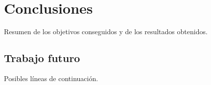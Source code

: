 \chapter{Conclusiones}

Resumen de los objetivos conseguidos y de los resultados obtenidos.

\section{Trabajo futuro}
Posibles líneas de continuación.
